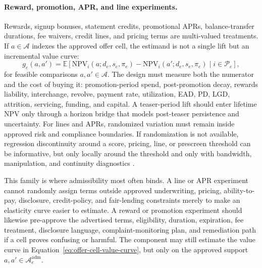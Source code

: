 \documentclass[11pt]{article}
\newcommand{\E}{\mathbb{E}}
\newcommand{\NPV}{\mathrm{NPV}}
\newcommand{\1}{\mathbf{1}}
\begin{document}
\paragraph{Reward, promotion, APR, and line experiments.}
Rewards, signup bonuses, statement credits, promotional APRs, balance-transfer
durations, fee waivers, credit lines, and pricing terms are multi-valued
treatments. If $a\in\mathcal{A}$ indexes the approved offer cell, the estimand
is not a single lift but an incremental value curve:
\begin{equation}
  g_e(a,a')
  =
  \E[\NPV_i(a;d_e,s_e,\pi_e)-\NPV_i(a';d_e,s_e,\pi_e)
  \mid i\in\mathcal{P}_e],
  \label{eq:offer-cell-value-curve}
\end{equation}
for feasible comparisons $a,a'\in\mathcal{A}$. The design must measure both
the numerator and the cost of buying it: promotion-period spend, post-promotion
decay, rewards liability, interchange, revolve, payment rate, utilization,
EAD, PD, LGD, attrition, servicing, funding, and capital. A teaser-period lift
should enter lifetime NPV only through a horizon bridge that models post-teaser
persistence and uncertainty. For lines and APRs, randomized variation must
remain inside approved risk and compliance boundaries. If randomization is not
available, regression discontinuity around a score, pricing, line, or
prescreen threshold can be informative, but only locally around the threshold
and only with bandwidth, manipulation, and continuity diagnostics
\citep{lee2010rd}.

This family is where admissibility most often binds. A line or APR experiment
cannot randomly assign terms outside approved underwriting, pricing,
ability-to-pay, disclosure, credit-policy, and fair-lending constraints merely
to make an elasticity curve easier to estimate. A reward or promotion
experiment should likewise pre-approve the advertised terms, eligibility,
duration, expiration, fee treatment, disclosure language, complaint-monitoring
plan, and remediation path if a cell proves confusing or harmful. The
component may still estimate the value curve in
Equation~\eqref{eq:offer-cell-value-curve}, but only on the approved support
$a,a'\in\mathcal{A}^{\mathrm{adm}}_e$.
\end{document}
